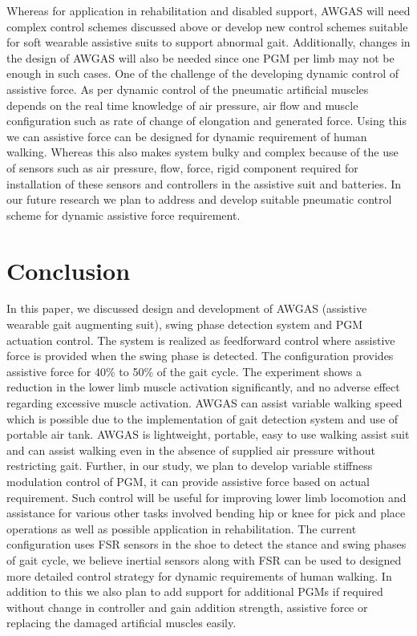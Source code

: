 \documentclass[paper,JRM,paper]{jaciiiarticle}
\begin{document}
Whereas for application in rehabilitation and disabled support, AWGAS will need complex control schemes discussed above or develop new control schemes suitable for soft wearable assistive suits to support abnormal gait. Additionally, changes in the design of AWGAS will also be needed since one PGM per limb may not be enough in such cases. 
One of the challenge of the developing dynamic control of assistive force. As per \cite{25,29} dynamic control of the pneumatic artificial muscles depends on the real time knowledge of air pressure, air flow and muscle configuration such as rate of change of elongation and generated force. Using this we can assistive force can be designed for dynamic requirement of human walking. Whereas this also makes system bulky and complex because of the use of sensors such as air pressure, flow, force, rigid component required for installation of these sensors and controllers in the assistive suit and batteries. In our future research we plan to address and develop suitable pneumatic control scheme for dynamic assistive force requirement.



\section{Conclusion}

In this paper, we discussed design and development of AWGAS (assistive wearable gait augmenting suit), swing phase detection system and PGM actuation control. The system is realized as feedforward control where assistive force is provided when the swing phase is detected. The configuration provides assistive force for 40\% to 50\% of the gait cycle. The experiment shows a reduction in the lower limb muscle activation significantly, and no adverse effect regarding excessive muscle activation. AWGAS can assist variable walking speed which is possible due to the implementation of gait detection system and use of portable air tank. AWGAS is lightweight, portable, easy to use walking assist suit and can assist walking even in the absence of supplied air pressure without restricting gait. Further, in our study, we plan to develop variable stiffness modulation control of PGM, it can provide assistive force based on actual requirement. Such control will be useful for improving lower limb locomotion and assistance for various other tasks involved bending hip or knee for pick and place operations as well as possible application in rehabilitation. The current configuration uses FSR sensors in the shoe to detect the stance and swing phases of gait cycle, we believe inertial sensors along with FSR can be used to designed more detailed control strategy for dynamic requirements of human walking. In addition to this we also plan to add support for additional PGMs if required without change in controller and gain addition strength, assistive force or replacing the damaged artificial muscles easily. 
\end{document}
